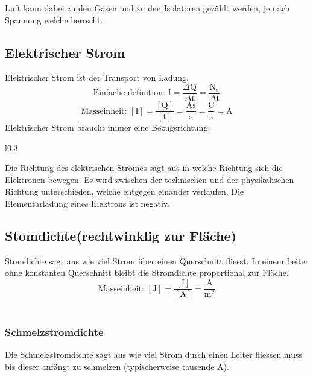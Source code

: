 Luft kann dabei zu den Gasen und zu den Isolatoren gezählt werden, je nach Spannung welche herrscht.\\

\subsection{Elektrischer Strom}

Elektrischer Strom ist der Transport von Ladung.
\[ \text{Einfache definition: I} = \dfrac{\Delta\text{Q}}{\Delta\textbf{t}} = \dfrac{\text{N}_\text{e}}{\Delta\textbf{t}}\]
\[\text{Masseinheit: }[\text{I}] = \dfrac{[\text{Q}]}{[\text{t}]} = \dfrac{\unit{\ampere\second}}{\unit{\second}} = \dfrac{\unit{\coulomb}}{\unit{\second}} = \unit{\ampere}\]
Elektrischer Strom braucht immer eine Bezugsrichtung:\\
\begin{wrapfigure}{l}{0.3\linewidth}
    
\end{wrapfigure}
Die Richtung des elektrischen Stromes sagt aus in welche Richtung sich die Elektronen bewegen. 
Es wird zwischen der technischen und der physikalischen Richtung unterschieden, welche entgegen einander verlaufen. 
Die Elementarladung eines Elektrons ist negativ.\\

\subsection{Stomdichte(rechtwinklig zur Fläche)}

Stomdichte sagt aus wie viel Strom über einen Querschnitt fliesst. 
In einem Leiter ohne konstanten Querschnitt bleibt die Stromdichte proportional zur Fläche.
\[\text{Masseinheit: }[\text{J}] = \dfrac{[\text{I}]}{[\text{A}]} = \dfrac{\unit{\ampere}}{\unit{\square\meter}}\]\\


\begin{center}
    
\end{center}

\subsubsection{Schmelzstromdichte}

Die Schmelzstromdichte sagt aus wie viel Strom durch einen Leiter fliessen muss bis dieser anfängt zu schmelzen (typischerweise tausende \unit{\ampere}).

